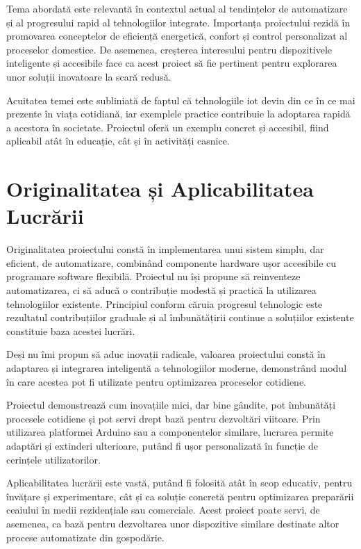 Tema abordată este relevantă în contextul %
actual al tendințelor de automatizare și %
al progresului rapid al tehnologiilor %
integrate. Importanța proiectului rezidă %
în promovarea conceptelor de eficiență %
energetică, confort și control personalizat %
al proceselor domestice. De asemenea, %
creșterea interesului pentru dispozitivele %
inteligente și accesibile face ca acest %
proiect să fie pertinent pentru explorarea %
unor soluții inovatoare la scară redusă. %

Acuitatea temei este subliniată de faptul %
că tehnologiile \gls{iot} devin din ce în ce %
mai prezente în viața cotidiană, iar %
exemplele practice contribuie la adoptarea %
rapidă a acestora în societate. Proiectul %
oferă un exemplu concret și accesibil, %
fiind aplicabil atât în educație, cât și %
în activități casnice. %

\section{Originalitatea și Aplicabilitatea Lucrării}
\label{sec:origsiaplic}

Originalitatea proiectului constă în %
implementarea unui sistem simplu, dar %
eficient, de automatizare, combinând %
componente hardware ușor accesibile cu %
programare software flexibilă. Proiectul %
nu își propune să reinventeze %
automatizarea, ci să aducă o contribuție %
modestă și practică la utilizarea %
tehnologiilor existente. Principiul %
conform căruia progresul tehnologic este %
rezultatul contribuțiilor graduale și %
al îmbunătățirii continue a soluțiilor %
existente constituie baza acestei lucrări. %

Deși nu îmi propun să aduc inovații %
radicale, valoarea proiectului constă în %
adaptarea și integrarea inteligentă a %
tehnologiilor moderne, demonstrând modul %
în care acestea pot fi utilizate pentru %
optimizarea proceselor cotidiene. %

Proiectul demonstrează cum inovațiile %
mici, dar bine gândite, pot îmbunătăți %
procesele cotidiene și pot servi drept %
bază pentru dezvoltări viitoare. Prin %
utilizarea platformei Arduino sau a %
componentelor similare, lucrarea permite %
adaptări și extinderi ulterioare, putând %
fi ușor personalizată în funcție de %
cerințele utilizatorilor. %

Aplicabilitatea lucrării este vastă, %
putând fi folosită atât în scop educativ, %
pentru învățare și experimentare, cât și %
ca soluție concretă pentru optimizarea %
preparării ceaiului în medii rezidențiale %
sau comerciale. Acest proiect poate %
servi, de asemenea, ca bază pentru %
dezvoltarea unor dispozitive similare %
destinate altor procese automatizate din %
gospodărie. %





